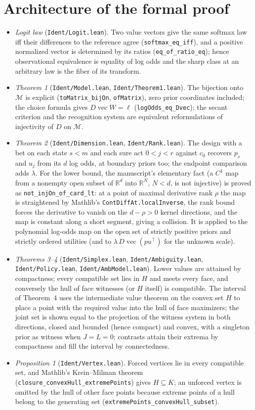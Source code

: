 \documentclass[11pt]{article}
\newcommand{\R}{\mathbb R}
\newcommand{\M}{\mathcal M}
\DeclareMathOperator{\vecop}{vec}
\begin{document}
\section{Architecture of the formal proof}

\begin{itemize}
\item \emph{Logit law} (\texttt{Ident/Logit.lean}). Two value vectors give the same softmax law iff their differences to the reference agree (\texttt{softmax\_eq\_iff}), and a positive normalized vector is determined by its ratios (\texttt{eq\_of\_ratio\_eq}); hence observational equivalence is equality of log odds and the sharp class at an arbitrary law is the fiber of its transform.
\item \emph{Theorem 1} (\texttt{Ident/Model.lean}, \texttt{Ident/Theorem1.lean}). The bijection onto $\M$ is explicit (\texttt{toMatrix\_bijOn}, \texttt{ofMatrix}), zero prior coordinates included; the choice formula gives $D\vecop W=\ell$ (\texttt{logOdds\_eq\_Dvec}); the secant criterion and the recognition system are equivalent reformulations of injectivity of $D$ on $\M$.
\item \emph{Theorem 2} (\texttt{Ident/Dimension.lean}, \texttt{Ident/Rank.lean}). The design with a bet on each state $s<m$ and each sure act $0<j<r$ against $c_0$ recovers $p_s$ and $u_j$ from its $d$ log odds, at boundary priors too; the endpoint comparison adds $\lambda$. For the lower bound, the manuscript's elementary fact (a $C^1$ map from a nonempty open subset of $\R^d$ into $\R^N$, $N<d$, is not injective) is proved as \texttt{not\_injOn\_of\_card\_lt}: at a point of maximal derivative rank $\rho$ the map is straightened by Mathlib's \texttt{ContDiffAt.localInverse}, the rank bound forces the derivative to vanish on the $d-\rho>0$ kernel directions, and the map is constant along a short segment, giving a collision. It is applied to the polynomial log-odds map on the open set of strictly positive priors and strictly ordered utilities (and to $\lambda\,D\vecop(pu^\top)$ for the unknown scale).
\item \emph{Theorems 3--4} (\texttt{Ident/Simplex.lean}, \texttt{Ident/Ambiguity.lean}, \texttt{Ident/Policy.lean}, \texttt{Ident/AmbModel.lean}). Lower values are attained by compactness; every compatible set lies in $H$ and meets every face, and conversely the hull of face witnesses (or $H$ itself) is compatible. The interval of Theorem~4 uses the intermediate value theorem on the convex set $H$ to place a point with the required value into the hull of face maximizers; the joint set is shown equal to the projection of the witness system in both directions, closed and bounded (hence compact) and convex, with a singleton prior as witness when $J=L=0$; contrasts attain their extrema by compactness and fill the interval by connectedness.
\item \emph{Proposition 1} (\texttt{Ident/Vertex.lean}). Forced vertices lie in every compatible set, and Mathlib's Krein--Milman theorem (\texttt{closure\_convexHull\_extremePoints}) gives $H\subseteq K$; an unforced vertex is omitted by the hull of other face points because extreme points of a hull belong to the generating set (\texttt{extremePoints\_convexHull\_subset}).
\end{itemize}
\end{document}

